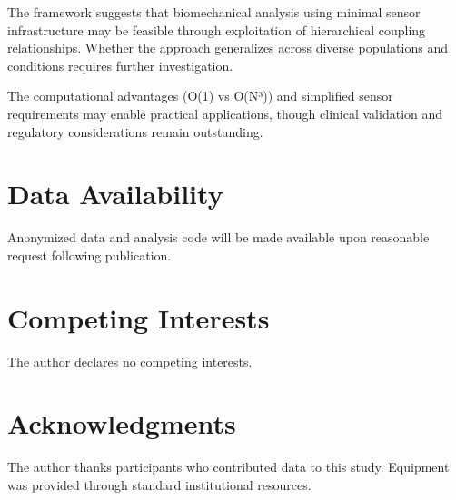 \documentclass[12pt,twocolumn]{article}
\begin{document}
The framework suggests that biomechanical analysis using minimal sensor infrastructure may be feasible through exploitation of hierarchical coupling relationships. Whether the approach generalizes across diverse populations and conditions requires further investigation.

The computational advantages (O(1) vs O(N³)) and simplified sensor requirements may enable practical applications, though clinical validation and regulatory considerations remain outstanding.

\section*{Data Availability}

Anonymized data and analysis code will be made available upon reasonable request following publication.

\section*{Competing Interests}

The author declares no competing interests.

\section*{Acknowledgments}

The author thanks participants who contributed data to this study. Equipment was provided through standard institutional resources.
\end{document}
